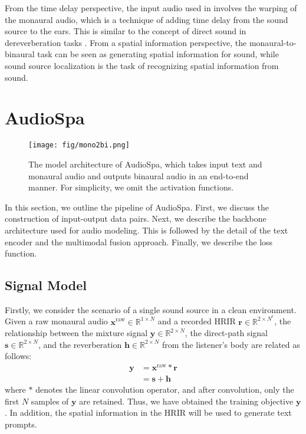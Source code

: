 \documentclass{IEEEtran}
\begin{document}
From the time delay perspective, the input audio used in \cite{richard2021neural, leng2022binauralgrad} involves the warping of the monaural audio, which is a technique of adding time delay from the sound source to the ears. This is similar to the concept of direct sound in dereverberation tasks \cite{zhao2024multi, guo2024graph}. From a spatial information perspective, the monaural-to-binaural task can be seen as generating spatial information for sound, while sound source localization \cite{feng2023soft,feng2024learning,feng2025eliminating} is the task of recognizing spatial information from sound.

\section{AudioSpa}   \label{sec:spa}

\begin{figure*}[t]
    \centering
    \texttt{[image: fig/mono2bi.png]}
    \caption{The model architecture of AudioSpa, which takes input text and monaural audio and outputs binaural audio in an end-to-end manner. For simplicity, we omit the activation functions.}
    \label{fig:mono2bi}
\end{figure*}

In this section, we outline the pipeline of AudioSpa. First, we discuss the construction of input-output data pairs. Next, we describe the backbone architecture used for audio modeling. This is followed by the detail of the text encoder and the multimodal fusion approach. Finally, we describe the loss function.

\subsection{Signal Model} \label{subsec:signal}
Firstly, we consider the scenario of a single sound source in a clean environment. Given a raw monaural audio $\mathbf{x}^\mathrm{raw} \in \mathbb{R}^{1 \times N}$ and a recorded HRIR $\mathbf{r} \in \mathbb{R}^{2 \times N^r}$, the relationship between the mixture signal $\mathbf{y} \in \mathbb{R}^{2 \times N}$, the direct-path signal $\mathbf{s} \in \mathbb{R}^{2 \times N}$, and the reverberation $\mathbf{h} \in \mathbb{R}^{2 \times N}$ from the listener’s body are related as follows:
\begin{equation}\label{eq:signal_bi}
    \begin{aligned}
        \mathbf{y} &= \mathbf{x}^\mathrm{raw} * \mathbf{r} \\
         &=  \mathbf{s} + \mathbf{h}
    \end{aligned}
\end{equation}
where $*$ denotes the linear convolution operator, and after convolution, only the first $N$ samples of $\mathbf{y}$ are retained. Thus, we have obtained the training objective $\mathbf{y}$. In addition, the spatial information in the HRIR will be used to generate text prompts.
\end{document}
